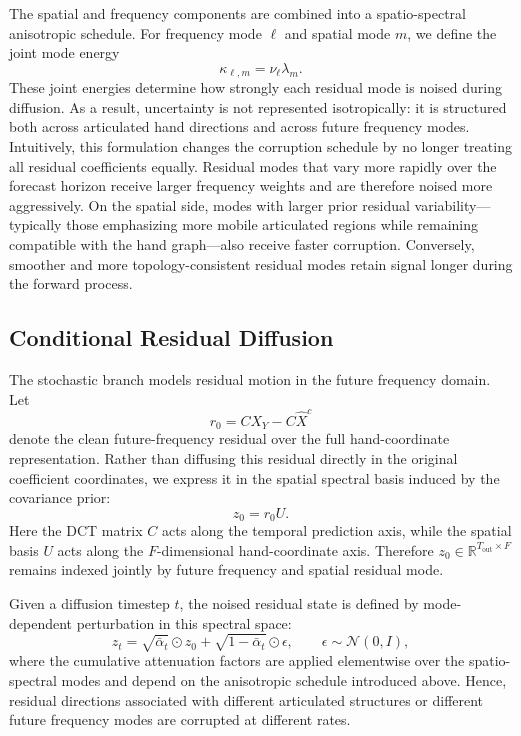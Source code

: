 The spatial and frequency components are combined into a spatio-spectral anisotropic schedule. For frequency mode $\ell$ and spatial mode $m$, we define the joint mode energy
\[
\kappa_{\ell,m} = \nu_\ell \lambda_m.
\]
These joint energies determine how strongly each residual mode is noised during diffusion. As a result, uncertainty is not represented isotropically: it is structured both across articulated hand directions and across future frequency modes.
Intuitively, this formulation changes the corruption schedule by no longer treating all residual coefficients equally. Residual modes that vary more rapidly over the forecast horizon receive larger frequency weights and are therefore noised more aggressively. On the spatial side, modes with larger prior residual variability---typically those emphasizing more mobile articulated regions while remaining compatible with the hand graph---also receive faster corruption. Conversely, smoother and more topology-consistent residual modes retain signal longer during the forward process.

\subsection{Conditional Residual Diffusion}
\label{sec:method_diffusion}

The stochastic branch models residual motion in the future frequency domain. Let
\[
r_0 = C X_Y - C \hat{X}^{c}
\]
denote the clean future-frequency residual over the full hand-coordinate representation. Rather than diffusing this residual directly in the original coefficient coordinates, we express it in the spatial spectral basis induced by the covariance prior:
\[
z_0 = r_0 U.
\]
Here the DCT matrix $C$ acts along the temporal prediction axis, while the spatial basis $U$ acts along the $F$-dimensional hand-coordinate axis. Therefore $z_0 \in \mathbb{R}^{T_{\mathrm{out}} \times F}$ remains indexed jointly by future frequency and spatial residual mode.

Given a diffusion timestep $t$, the noised residual state is defined by mode-dependent perturbation in this spectral space:
\[
z_t =
\sqrt{\bar{\alpha}_t}\odot z_0
+
\sqrt{1-\bar{\alpha}_t}\odot \epsilon,
\qquad
\epsilon \sim \mathcal{N}(0,I),
\]
where the cumulative attenuation factors are applied elementwise over the spatio-spectral modes and depend on the anisotropic schedule introduced above. Hence, residual directions associated with different articulated structures or different future frequency modes are corrupted at different rates.

